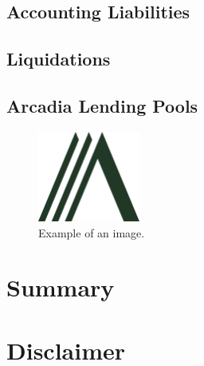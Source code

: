 \documentclass[sigconf,nonacm]{acmart}
\begin{document}
\subsection{Accounting Liabilities}

\subsection{Liquidations}

\lipsum[5]

\subsection{Arcadia Lending Pools}

\lipsum[6]

\begin{figure}
    \label{fig:arcadia-logo}
    \centering
    \includegraphics[width=0.3\textwidth]{images/Logo-Arcadia.png}
    \caption{Example of an image.}
  \end{figure}

\section{Summary}
\lipsum[7]




\section*{Disclaimer}
\lipsum[8]
\end{document}

